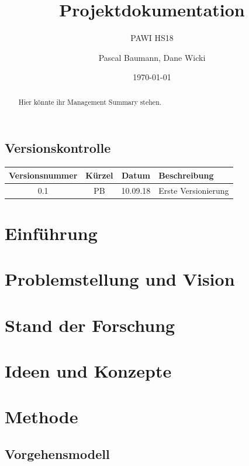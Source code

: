 \documentclass[a4paper]{scrreprt}
\title{Projektdokumentation}
\subtitle{PAWI HS18}
\author{Pascal Baumann, Dane Wicki}
\date{\today}
\begin{document}
\begin{titlepage}
\maketitle
\end{titlepage}

\renewcommand{\abstractname}{Management Summary}
\begin{abstract}
	Hier könnte ihr Management Summary stehen.
\end{abstract}

\section*{Versionskontrolle}

\begin{tabularx}{\textwidth}{|c|c|c|X|}
	\hline
	\textbf{Versionsnummer} & \textbf{Kürzel} & \textbf{Datum} & \textbf{Beschreibung} \\
	\hline
	0.1 & PB & 10.09.18 & Erste Versionierung \\
	\hline
\end{tabularx}

\tableofcontents

\chapter{Einführung}

\chapter{Problemstellung und Vision}

\chapter{Stand der Forschung}

\chapter{Ideen und Konzepte}

\chapter{Methode}

\section{Vorgehensmodell}
\end{document}
